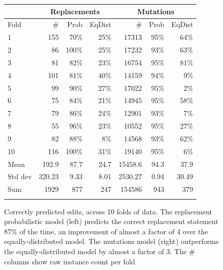 \documentclass[conference]{IEEEtran}
\begin{document}
\begin{figure}[ht]
{\footnotesize
{\centering
\begin{tabular}{l|rrr|rrr}
\toprule
   &\multicolumn{3}{c|}{Replacements} &\multicolumn{3}{c}{Mutations} \\
\midrule
Fold	& \# &Prob& EqDist& \#&Prob& EqDist \\
\midrule
1	& 155&70\%&	25\% &17313&  95\% & 64\%   \\
2	& 86&100\%&	25\%  & 17232& 93\% & 63\%   \\
3	& 81&82\%	&23\%  & 16754& 95\% & 81\% \\
4	& 101&81\%	&40\%  & 14159& 94\% & 9\%   \\
5	& 99&90\%	&27\%  & 17022& 95\% & 2\%  \\
6	& 75&84\%	&21\%  & 14945& 95\%& 58\%  \\
7	& 79&86\%	&24\%  & 12901& 93\%& 7\%  \\
8	& 55&96\%	&23\%  & 10552& 95\%& 27\%  \\
9	& 82&88\%	&8\%  & 14568& 93\%& 62\% \\
10	& 116&100\%	&31\% & 19140 & 95\% & 6\% \\
\midrule
Mean	& 192.9 &87.7	&24.7& 15458.6  & 94.3 & 37.9  \\
\midrule
Std dev	& 320.23&9.33&	8.01 & 2530.27 & 0.94 & 30.49   \\
\midrule
Sum & 1929&877 & 247 &  154586& 943 & 379  \\
\bottomrule

\newline
\end{tabular}
\center
  \caption{Correctly predicted edits, across 10 folds of data.
The replacement probabilistic model (left) predicts
    the correct replacement statement 87\% of the time,
    an improvement of almost a factor of 4 over the equally-distributed model. 
    The mutations model (right) outperforms the equally-distributed model by 
    almost a factor of 3. The \# columns show raw instance count per fold. \label{results10fcv}} 
}}

\end{figure} 
\end{document}
